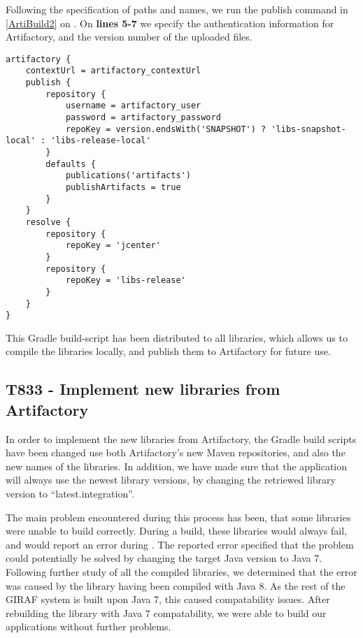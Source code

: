 Following the specification of paths and names, we run the publish command in
\autoref{ArtiBuild2} on \label{lines 3-19}. On \textbf{lines 5-7} we specify the
authentication information for Artifactory, and the version number of the
uploaded files.\nl

\begin{minipage}[H]{\linewidth}
\begin{lstlisting}[caption = Publishing the compiled libraries to Artifactory, label = ArtiBuild2] 
artifactory {
    contextUrl = artifactory_contextUrl
    publish {
        repository {
            username = artifactory_user
            password = artifactory_password
            repoKey = version.endsWith('SNAPSHOT') ? 'libs-snapshot-local' : 'libs-release-local'
        }
        defaults {
            publications('artifacts')
            publishArtifacts = true
        }
    }
    resolve {
        repository {
            repoKey = 'jcenter'
        }
        repository {
            repoKey = 'libs-release'
        }
    }
}
\end{lstlisting}
\end{minipage}

This Gradle build-script has been distributed to all libraries, which allows us
to compile the libraries locally, and publish them to Artifactory for future
use.

\subsection{T833 - Implement new libraries from Artifactory}
In order to implement the new libraries from Artifactory, the Gradle
build scripts have been changed use both Artifactory's new Maven
repositories, and also the new names of the libraries. In addition, we have made
sure that the application will always use the newest library versions, by
changing the retriewed library version to ``latest.integration''.\nl

The main problem encountered during this process has been, that some libraries
were unable to build correctly. During a build, these libraries would always
fail, and would report an error during
. The reported error specified
that the problem could potentially be solved by changing the target Java version
to Java 7. Following further study of all the compiled libraries, we determined
that the error was caused by the  library having been
compiled with Java 8. As the rest of the GIRAF system is built upon Java 7, this caused
compatability issues. After rebuilding the library with Java 7 compatability, we
were able to build our applications without further problems.


